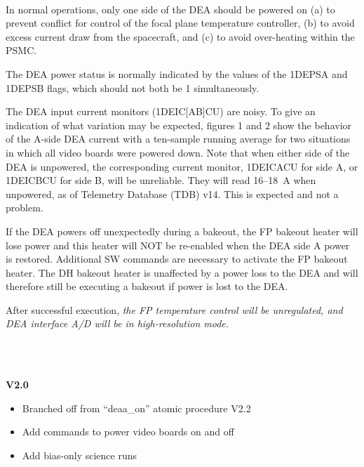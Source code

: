\documentclass[11pt]{article}
\begin{document}
\normalsize
{} \\
\normalsize

In normal operations, only one side of the DEA should be powered on
(a) to prevent conflict for control of the focal plane temperature controller,
(b) to avoid excess current draw from the spacecraft, and (c) to avoid over-heating
within the PSMC.

The DEA power status is normally indicated by the values of the 1DEPSA and
1DEPSB flags, which should not both be 1 simultaneously.

The DEA input current monitors (1DEIC[AB]CU) are noisy.
To give an indication of what variation may be expected, figures 1 and 2
show the behavior of the A-side DEA current with a ten-sample running
average for two situations in which all video boards were powered down. Note that
when either side of the DEA is unpowered, the corresponding current monitor, 
1DEICACU for side A, or 1DEICBCU for side B, will be unreliable. They will read
16--18~A when unpowered, as of Telemetry Database (TDB) v14. This is expected and
not a problem.

{\color{red} If the DEA powers off unexpectedly during a bakeout, the FP bakeout 
heater will lose power and this heater will NOT be re-enabled when the DEA side A 
power is restored. Additional SW commands are necessary to activate the FP bakeout 
heater. The DH bakeout heater is unaffected by a power loss to the DEA and will 
therefore still be executing a bakeout if power is lost to the DEA.}

After successful execution, {\em the FP temperature control will be unregulated,
and DEA interface A/D will be in {\color{red} high-resolution mode.}}\\

\vspace{0.15in}
\normalsize
{} \\
\normalsize

\normalsize
{} \\
\normalsize

{\bf V2.0}
\begin{itemize}
\item Branched off from ``deaa\_on'' atomic procedure V2.2
\item Add commands to power video boards on and off
\item Add bias-only science runs
\end{itemize}
\end{document}
